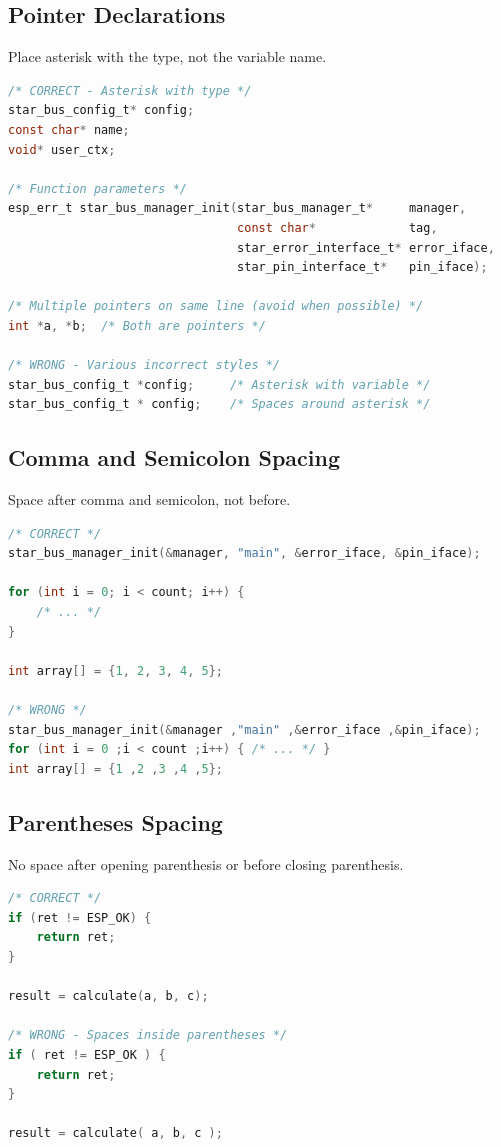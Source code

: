 \subsection{Pointer Declarations}

Place asterisk with the type, not the variable name.

\begin{lstlisting}[language=C]
/* CORRECT - Asterisk with type */
star_bus_config_t* config;
const char* name;
void* user_ctx;

/* Function parameters */
esp_err_t star_bus_manager_init(star_bus_manager_t*     manager,
                                const char*             tag,
                                star_error_interface_t* error_iface,
                                star_pin_interface_t*   pin_iface);

/* Multiple pointers on same line (avoid when possible) */
int *a, *b;  /* Both are pointers */

/* WRONG - Various incorrect styles */
star_bus_config_t *config;     /* Asterisk with variable */
star_bus_config_t * config;    /* Spaces around asterisk */
\end{lstlisting}

\subsection{Comma and Semicolon Spacing}

Space after comma and semicolon, not before.

\begin{lstlisting}[language=C]
/* CORRECT */
star_bus_manager_init(&manager, "main", &error_iface, &pin_iface);

for (int i = 0; i < count; i++) {
    /* ... */
}

int array[] = {1, 2, 3, 4, 5};

/* WRONG */
star_bus_manager_init(&manager ,"main" ,&error_iface ,&pin_iface);
for (int i = 0 ;i < count ;i++) { /* ... */ }
int array[] = {1 ,2 ,3 ,4 ,5};
\end{lstlisting}

\subsection{Parentheses Spacing}

No space after opening parenthesis or before closing parenthesis.

\begin{lstlisting}[language=C]
/* CORRECT */
if (ret != ESP_OK) {
    return ret;
}

result = calculate(a, b, c);

/* WRONG - Spaces inside parentheses */
if ( ret != ESP_OK ) {
    return ret;
}

result = calculate( a, b, c );
\end{lstlisting}

